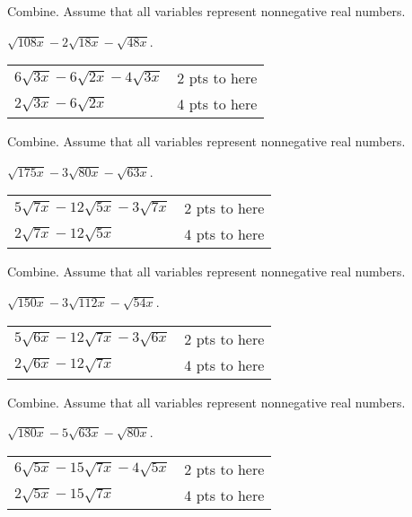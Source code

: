 {
	Combine. Assume that all variables represent nonnegative real numbers. 
	
	\noindent $\displaystyle \sqrt{108x}-2\sqrt{18x}-\sqrt{48x}$.
}
{
	\begin{tabular}{l r}
	$6\sqrt{3x}-6\sqrt{2x}-4\sqrt{3x}$ & 2 pts to here\\
	$2\sqrt{3x}-6\sqrt{2x}$ & 4 pts to here
	\end{tabular}
}

{
	Combine. Assume that all variables represent nonnegative real numbers.
	
	\noindent $\displaystyle \sqrt{175x}-3\sqrt{80x}-\sqrt{63x}$.
}
{
	\begin{tabular}{l r}
	$5\sqrt{7x}-12\sqrt{5x}-3\sqrt{7x}$ & 2 pts to here\\
	$2\sqrt{7x}-12\sqrt{5x}$ & 4 pts to here
	\end{tabular}
}

{
	Combine. Assume that all variables represent nonnegative real numbers. 
	
	\noindent $\displaystyle \sqrt{150x}-3\sqrt{112x}-\sqrt{54x}$.
}
{
	\begin{tabular}{l r}
	$5\sqrt{6x}-12\sqrt{7x}-3\sqrt{6x}$ & 2 pts to here\\
	$2\sqrt{6x}-12\sqrt{7x}$ & 4 pts to here
	\end{tabular}
}

{
	Combine. Assume that all variables represent nonnegative real numbers. 
	
	\noindent $\displaystyle \sqrt{180x}-5\sqrt{63x}-\sqrt{80x}$.
}
{
	\begin{tabular}{l r}
	$6\sqrt{5x}-15\sqrt{7x}-4\sqrt{5x}$ & 2 pts to here\\
	$2\sqrt{5x}-15\sqrt{7x}$ & 4 pts to here
	\end{tabular}
}
